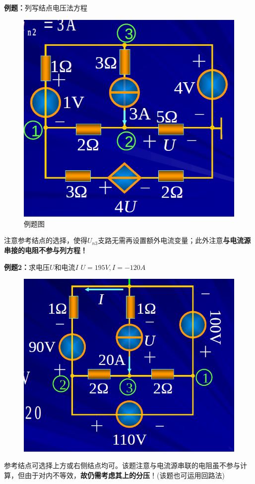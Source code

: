 \documentclass[11pt,a4paper,oneside]{book}
\begin{document}
\newpage
\noindent\textbf{例题：}列写结点电压法方程
\begin{figure}[H]
	\centering
	\includegraphics[width=0.5\linewidth]{screenshot049}
	\caption{例题图}
	\label{fig:screenshot049}
\end{figure}
注意参考结点的选择，使得$U_{n3}$支路无需再设置额外电流变量；此外注意\textbf{与电流源串接的电阻不参与列方程！}

\noindent\textbf{例题2：}求电压$U$和电流$I$ \quad  $U=195V,I=-120A$
\begin{figure}[H]
	\centering
	\includegraphics[width=0.5\linewidth]{screenshot050}
	\caption{}
	\label{fig:screenshot050}
\end{figure}
参考结点可选择上方或右侧结点均可。该题注意与电流源串联的电阻虽不参与计算，但由于对内不等效，\textbf{故仍需考虑其上的分压}！(该题也可运用回路法)
\end{document}
